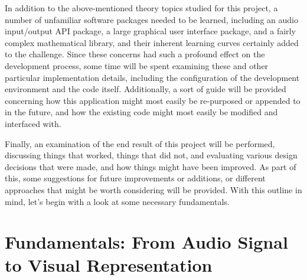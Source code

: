 \documentclass[12pt]{report}
\begin{document}
\indent In addition to the above-mentioned theory topics studied for this project, a number of unfamiliar software packages needed to be learned, including an audio input/output API package, a large graphical user interface package, and a fairly complex mathematical library, and their inherent learning curves certainly added to the challenge. Since these concerns had such a profound effect on the development process, some time will be spent examining these and other particular implementation details, including the configuration of the development environment and the code itself. Additionally, a sort of guide will be provided concerning how this application might most easily be re-purposed or appended to in the future, and how the existing code might most easily be modified and interfaced with.

\indent Finally, an examination of the end result of this project will be performed, discussing things that worked, things that did not, and evaluating various design decisions that were made, and how things might have been improved. As part of this, some suggestions for future improvements or additions, or different approaches that might be worth considering will be provided. With this outline in mind, let's begin with a look at some necessary fundamentals.
\clearpage


\chapter[Fundamentals: From Audio Signal to Visual Representation]{Fundamentals: From Audio Signal \\to Visual Representation}

\end{document}
